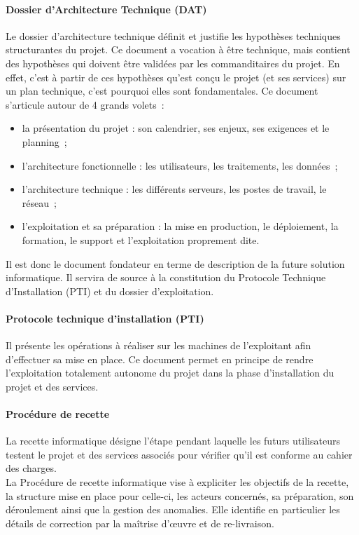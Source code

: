\paragraph{Dossier d'Architecture Technique (DAT)}
Le dossier d'architecture technique définit et justifie les hypothèses techniques structurantes du projet. Ce document a vocation à être technique, mais contient des hypothèses qui doivent être validées par les commanditaires du projet. En effet, c'est à partir de ces hypothèses qu'est conçu le projet (et ses services) sur un plan technique, c'est pourquoi elles sont fondamentales.
Ce document s'articule autour de 4 grands volets~:
\begin{itemize}
	\item la présentation du projet : son calendrier, ses enjeux, ses exigences et le planning~;
	\item l'architecture fonctionnelle : les utilisateurs, les traitements, les données~;
	\item l'architecture technique : les différents serveurs, les postes de travail, le réseau~;
	\item l'exploitation et sa préparation : la mise en production, le déploiement, la formation, le support et l'exploitation proprement dite.
\end{itemize}
Il est donc le document fondateur en terme de description de la future solution informatique. Il servira de source à la constitution du Protocole Technique d'Installation (PTI) et du dossier d'exploitation.

\paragraph{Protocole technique d'installation (PTI)}
Il présente les opérations à réaliser sur les machines de l'exploitant afin d'effectuer sa mise en place. Ce document permet en principe de rendre l'exploitation totalement autonome du projet dans la phase d'installation du projet et des services.

\paragraph{Procédure de recette}
La recette informatique désigne l'étape pendant laquelle les futurs utilisateurs testent le projet et des services associés pour vérifier qu'il est conforme au cahier des charges.
\\
La Procédure de recette informatique vise à expliciter les objectifs de la recette, la structure mise en place pour celle-ci, les acteurs concernés, sa préparation, son déroulement ainsi que la gestion des anomalies. Elle identifie en particulier les détails de correction par la maîtrise d'œuvre et de re-livraison.

